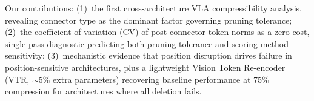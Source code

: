 Our contributions: (1)~the first cross-architecture VLA compressibility analysis, revealing connector type as the dominant factor governing pruning tolerance; (2)~the coefficient of variation (CV) of post-connector token norms as a zero-cost, single-pass diagnostic predicting both pruning tolerance and scoring method sensitivity; (3)~mechanistic evidence that position disruption drives failure in position-sensitive architectures, plus a lightweight Vision Token Re-encoder (VTR, ${\sim}$5\% extra parameters) recovering baseline performance at 75\% compression for architectures where all deletion fails.
